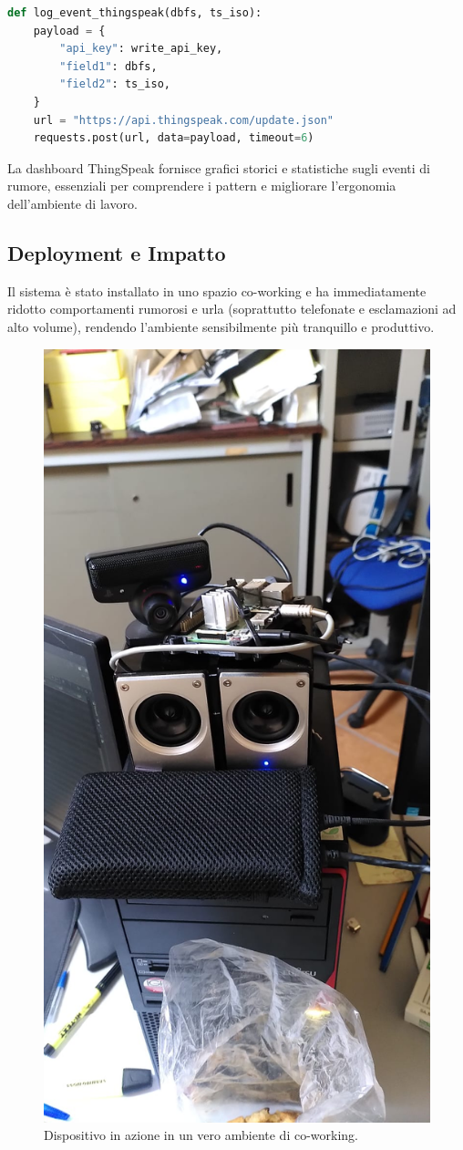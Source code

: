 \documentclass[fleqn,10pt]{SelfArx} %
\begin{document}
\begin{lstlisting}[language=Python]
	def log_event_thingspeak(dbfs, ts_iso):
	payload = {
		"api_key": write_api_key,
		"field1": dbfs,
		"field2": ts_iso,
	}
	url = "https://api.thingspeak.com/update.json"
	requests.post(url, data=payload, timeout=6)
\end{lstlisting}

La dashboard ThingSpeak fornisce grafici storici e statistiche sugli eventi di rumore, essenziali per comprendere i pattern e migliorare l’ergonomia dell’ambiente di lavoro.


\subsection{Deployment e Impatto}

Il sistema è stato installato in uno spazio co-working e ha immediatamente ridotto comportamenti rumorosi e urla (soprattutto telefonate e esclamazioni ad alto volume), rendendo l’ambiente sensibilmente più tranquillo e produttivo.

 \begin{figure}[ht]
	     \centering
	     \includegraphics[width=0.7\linewidth]{work.jpeg}
	     \caption{Dispositivo in azione in un vero ambiente di co-working.}
	     \label{fig:usage}
	 \end{figure}
\end{document}
